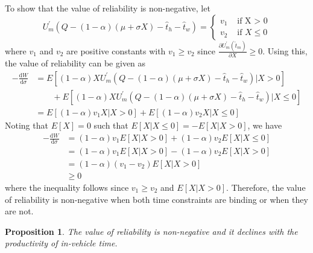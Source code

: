 \documentclass[12pt,a4paper,british]{article}
\makeatletter
\newenvironment{proof}[1][\proofname]{\par
    \normalfont\topsep6\p@\@plus6\p@\relax
    \trivlist
    \itemindent\parindent
    \item[\hskip\labelsep
          \scshape
      #1]\ignorespaces
  }{%
    \endtrivlist\@endpefalse
  }
\providecommand{\proofname}{Proof}
\newtheorem{prop}{Proposition}[section]
\makeatother
\begin{document}
\begin{proof}
To show that the value of reliability is non-negative, let
\begin{equation*}
U_{m}^{\prime}\left(Q-\left(1-\alpha\right)\left(\mu+\sigma X\right)-\hat{t}_{h}-\hat{t}_{w}\right) =
\begin{cases}
v_{1} & \mbox{ if X > 0}\\
v_{2} & \mbox{ if } X \leq 0
\end{cases}
\end{equation*}%
where $v_{1}$ and $v_{2}$ are positive constants with $v_{1}\geq v_{2}$ since $\frac{\partial U_{m}^{\prime}\left(\hat{t}_{m}\right)}{\partial X} \geq 0$. Using this, the value of reliability can be given as
\begin{align*}
-\frac{\mathrm{d}W}{\mathrm{d}\sigma} & =E\left[\left(1-\alpha\right)XU_{m}^{\prime}\left(Q-\left(1-\alpha\right)\left(\mu+\sigma X\right)-\hat{t}_{h}-\hat{t}_{w}\right)\vert X>0\right]\\
 & \qquad+E\left[\left(1-\alpha\right)XU_{m}^{\prime}\left(Q-\left(1-\alpha\right)\left(\mu+\sigma X\right)-\hat{t}_{h}-\hat{t}_{w}\right)\vert X\leq0\right]\\
 & =E\left[\left(1-\alpha\right)v_{1}X\vert X>0\right]+E\left[\left(1-\alpha\right)v_{2}X\vert X\leq0\right]
\end{align*}%
Noting that $E\left[X\right]=0$ such that $E\left[X\vert X\leq0\right]=-E\left[X\vert X>0\right]$, we have
\begin{align*}
-\frac{\mathrm{d}W}{\mathrm{d}\sigma} & =\left(1-\alpha\right)v_{1}E\left[X\vert X>0\right]+\left(1-\alpha\right)v_{2}E\left[X\vert X\leq0\right]\\
 & =\left(1-\alpha\right)v_{1}E\left[X\vert X>0\right]-\left(1-\alpha\right)v_{2}E\left[X\vert X>0\right]\\
 & =\left(1-\alpha\right)\left(v_{1}-v_{2}\right)E\left[X\vert X>0\right]\\
 & \geq0
\end{align*}
where the inequality follows since $v_{1}\geq v_{2}$ and $E\left[X\vert X>0\right]$. Therefore, the value of reliability is non-negative when both time constraints are binding or when they are not.
\end{proof}


\begin{prop}
The value of reliability is non-negative and it declines with the productivity of in-vehicle time. 
\end{prop}
\end{document}
